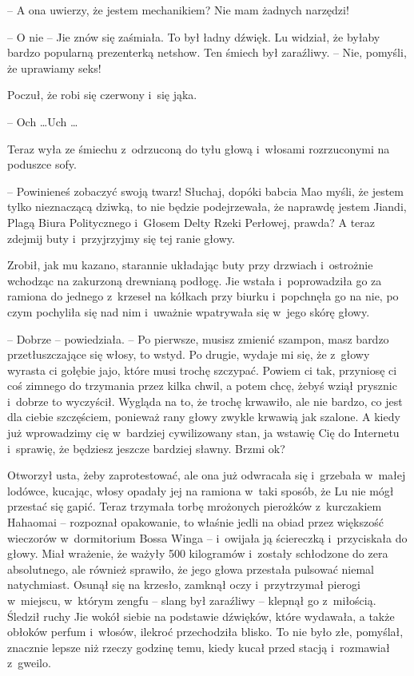 \documentclass[oneside,polish,11pt,rmheadings]{mwbk}
\begin{document}
-- A ona uwierzy, że jestem mechanikiem? Nie mam żadnych narzędzi!

-- O nie -- Jie znów się zaśmiała. To był ładny dźwięk. Lu widział, że byłaby bardzo popularną prezenterką netshow. Ten śmiech był zaraźliwy. -- Nie, pomyśli, że uprawiamy seks!

Poczuł, że robi się czerwony i~się jąka. 

-- Och \ldots  Uch \ldots 

Teraz wyła ze śmiechu z~odrzuconą do tyłu głową i~włosami rozrzuconymi na poduszce sofy. 

-- Powinieneś zobaczyć swoją twarz! Słuchaj, dopóki babcia Mao myśli, że jestem tylko nieznaczącą dziwką, to nie będzie podejrzewała, że naprawdę jestem Jiandi, Plagą Biura Politycznego i~Głosem Delty Rzeki Perłowej, prawda? A teraz zdejmij buty i~przyjrzyjmy się tej ranie głowy.

Zrobił, jak mu kazano, starannie układając buty przy drzwiach i~ostrożnie wchodząc na zakurzoną drewnianą podłogę. Jie wstała i~poprowadziła go za ramiona do jednego z~krzeseł na kółkach przy biurku i~popchnęła go na nie, po czym pochyliła się nad nim i~uważnie wpatrywała się w~jego skórę głowy. 

-- Dobrze -- powiedziała. -- Po pierwsze, musisz zmienić szampon, masz bardzo przetłuszczające się włosy, to wstyd. Po drugie, wydaje mi się, że z~głowy wyrasta ci gołębie jajo, które musi trochę szczypać. Powiem ci tak, przyniosę ci coś zimnego do trzymania przez kilka chwil, a potem chcę, żebyś wziął prysznic i~dobrze to wyczyścił. Wygląda na to, że trochę krwawiło, ale nie bardzo, co jest dla ciebie szczęściem, ponieważ rany głowy zwykle krwawią jak szalone. A kiedy już wprowadzimy cię w~bardziej cywilizowany stan, ja wstawię Cię do Internetu i~sprawię, że będziesz jeszcze bardziej sławny. Brzmi ok? 

Otworzył usta, żeby zaprotestować, ale ona już odwracała się i~grzebała w~małej lodówce, kucając, włosy opadały jej na ramiona w~taki sposób, że Lu nie mógł przestać się gapić. Teraz trzymała torbę mrożonych pierożków z~kurczakiem Hahaomai -- rozpoznał opakowanie, to właśnie jedli na obiad przez większość wieczorów w~dormitorium Bossa Winga -- i~owijała ją ściereczką i~przyciskała do głowy. Miał wrażenie, że ważyły 500 kilogramów i~zostały schłodzone do zera absolutnego, ale również sprawiło, że jego głowa przestała pulsować niemal natychmiast. Osunął się na krzesło, zamknął oczy i~przytrzymał pierogi w~miejscu, w~którym zengfu -- slang był zaraźliwy -- klepnął go z~miłością. Śledził ruchy Jie wokół siebie na podstawie dźwięków, które wydawała, a także obłoków perfum i~włosów, ilekroć przechodziła blisko. To nie było złe, pomyślał, znacznie lepsze niż rzeczy godzinę temu, kiedy kucał przed stacją i~rozmawiał z~gweilo.
\end{document}

